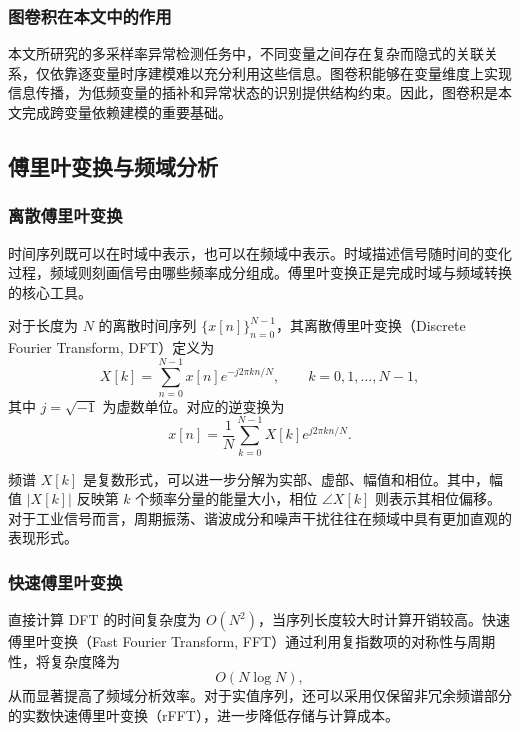 \documentclass[bachelor, vlined]{DissertUESTC}
\begin{document}
    \subsubsection{图卷积在本文中的作用}
    
    本文所研究的多采样率异常检测任务中，不同变量之间存在复杂而隐式的关联关系，仅依靠逐变量时序建模难以充分利用这些信息。图卷积能够在变量维度上实现信息传播，为低频变量的插补和异常状态的识别提供结构约束。因此，图卷积是本文完成跨变量依赖建模的重要基础。
    
    \subsection{傅里叶变换与频域分析}
    
    \subsubsection{离散傅里叶变换}
    
    时间序列既可以在时域中表示，也可以在频域中表示。时域描述信号随时间的变化过程，频域则刻画信号由哪些频率成分组成。傅里叶变换正是完成时域与频域转换的核心工具。
    
    对于长度为 $N$ 的离散时间序列 $\{x[n]\}_{n=0}^{N-1}$，其离散傅里叶变换（Discrete Fourier Transform, DFT）定义为
    \begin{equation}
        X[k] = \sum_{n=0}^{N-1} x[n] e^{-j 2\pi kn / N}, \qquad k = 0,1,\ldots,N-1,
    \end{equation}
    其中 $j = \sqrt{-1}$ 为虚数单位。对应的逆变换为
    \begin{equation}
        x[n] = \frac{1}{N}\sum_{k=0}^{N-1} X[k] e^{j 2\pi kn / N}.
    \end{equation}
    
    频谱 $X[k]$ 是复数形式，可以进一步分解为实部、虚部、幅值和相位。其中，幅值 $|X[k]|$ 反映第 $k$ 个频率分量的能量大小，相位 $\angle X[k]$ 则表示其相位偏移。对于工业信号而言，周期振荡、谐波成分和噪声干扰往往在频域中具有更加直观的表现形式。
    
    \subsubsection{快速傅里叶变换}
    
    直接计算 DFT 的时间复杂度为 $O(N^2)$，当序列长度较大时计算开销较高。快速傅里叶变换（Fast Fourier Transform, FFT）通过利用复指数项的对称性与周期性，将复杂度降为
    \begin{equation}
        O(N \log N),
    \end{equation}
    从而显著提高了频域分析效率。对于实值序列，还可以采用仅保留非冗余频谱部分的实数快速傅里叶变换（rFFT），进一步降低存储与计算成本。
    
\end{document}
